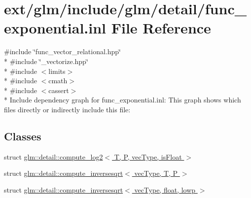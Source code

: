 \hypertarget{func__exponential_8inl}{\section{ext/glm/include/glm/detail/func\-\_\-exponential.inl File Reference}
\label{func__exponential_8inl}
}
{\ttfamily \#include \char`\"{}func\-\_\-vector\-\_\-relational.\-hpp\char`\"{}}\\*
{\ttfamily \#include \char`\"{}\-\_\-vectorize.\-hpp\char`\"{}}\\*
{\ttfamily \#include $<$limits$>$}\\*
{\ttfamily \#include $<$cmath$>$}\\*
{\ttfamily \#include $<$cassert$>$}\\*
Include dependency graph for func\-\_\-exponential.\-inl\-:
This graph shows which files directly or indirectly include this file\-:
\subsection*{Classes}
\begin{DoxyCompactItemize}
\item 
struct \hyperlink{structglm_1_1detail_1_1compute__log2}{glm\-::detail\-::compute\-\_\-log2$<$ T, P, vec\-Type, is\-Float $>$}
\item 
struct \hyperlink{structglm_1_1detail_1_1compute__inversesqrt}{glm\-::detail\-::compute\-\_\-inversesqrt$<$ vec\-Type, T, P $>$}
\item 
struct \hyperlink{structglm_1_1detail_1_1compute__inversesqrt_3_01vec_type_00_01float_00_01lowp_01_4}{glm\-::detail\-::compute\-\_\-inversesqrt$<$ vec\-Type, float, lowp $>$}
\end{DoxyCompactItemize}
